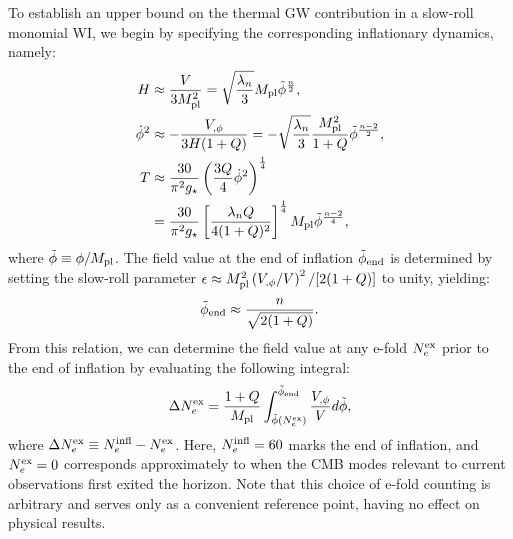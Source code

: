 To establish an upper bound on the thermal GW contribution in a slow-roll monomial WI, we begin by specifying the corresponding inflationary dynamics, namely:
\begin{align}
    H&\approx \frac{V}{3M_{\rm pl}^2}=\sqrt{\frac{\lambda_n}{3}}M_{\rm pl}\tilde{\phi}^{\frac{n}{2}}, \label{eq:ch7-A1}\\
    \dot{\phi}^2&\approx -\frac{V_{,\phi}}{3H(1+Q)}=-\sqrt{\frac{\lambda_n}{3}}\frac{M_{\rm pl}^2}{1+Q}\tilde\phi^{\frac{n-2}{2}}, \label{eq:ch7-A2} \\
    T&\approx \frac{30}{\pi^2 g_\star}\left(\frac{3Q}{4}\dot\phi^2\right)^{\frac{1}{4}} \nonumber \\
    &= \frac{30}{\pi^2 g_\star} \left[\frac{\lambda_n Q}{4(1+Q)^2}\right]^{\frac{1}{4}}M_{\rm pl}\tilde\phi^{\frac{n-2}{4}}, \label{eq:ch7-A3}
\end{align}
where $\tilde\phi\equiv \phi/M_{\rm pl}$. The field value at the end of inflation $\tilde\phi_{\rm end}$ is determined by setting the slow-roll parameter $\epsilon\approx M_{\rm pl}^2\left(V_{,\phi}/V\right)^2/[2(1+Q)]$ to unity, yielding:
\begin{equation}
    \tilde\phi_{\rm end}\approx \frac{n}{\sqrt{2(1+Q)}}.\label{eq:ch7-A4}
\end{equation}
From this relation, we can determine the field value at any e-fold $N_e^{\rm ex}$ prior to the end of inflation by evaluating the following integral:
\begin{equation}
    \Delta N_e^{\rm ex}=\frac{1+Q}{M_{\rm pl}}\int_{\tilde\phi(N_e^{\rm ex})}^{\tilde\phi_{\rm end}}\frac{V_{,\phi}}{V}d\tilde\phi, \label{eq:ch7-A5}
\end{equation}
where $\Delta N_e^{\rm ex}\equiv N_e^{\rm infl}-N_e^{\rm ex}$. Here, $N_e^{\rm infl}=60$ marks the end of inflation, and $N_e^{\rm ex}=0$ corresponds approximately to when the CMB modes relevant to current observations first exited the horizon. Note that this choice of e-fold counting is arbitrary and serves only as a convenient reference point, having no effect on physical results.

